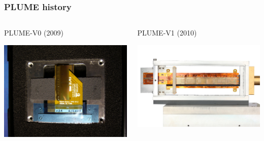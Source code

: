 \documentclass{beamer}
\begin{document}
  \begin{frame}[plain]
    \frametitle{PLUME history}

    \begin{columns}[t]
      \begin{column}{5cm}
        \centering
        PLUME-V0 (2009)

        \includegraphics[width = \textwidth]{Pictures/plume_ladder2009_1.jpg}
      \end{column}
      \begin{column}{5cm}
        \centering
        PLUME-V1 (2010)

        \includegraphics[width = \textwidth]{Pictures/plume_ladder2010_frontView.jpg}
      \end{column}
    \end{columns}
  \end{frame}
\end{document}
